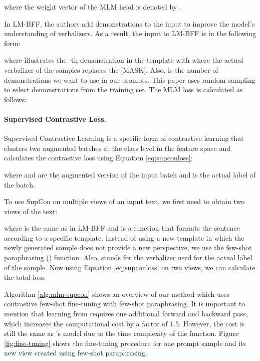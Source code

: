 \documentclass[11pt]{article}
\begin{document}
where the weight vector of the MLM head is denoted by .

In LM-BFF, the authors add demonstrations to the input  to improve the model's understanding of verbalizers. As a result, the input to LM-BFF is in the following form:


where  illustrates the -th demonstration in the template  with where the actual verbalizer of the samples replaces the [MASK]. Also,  is the number of demonstrations we want to use in our prompts. This paper uses random sampling to select demonstrations from the training set. The MLM loss is calculated as follows:


\paragraph{Supervised Contrastive Loss.}
Supervised Contrastive Learning is a specific form of contrastive learning \cite{chen2020simple, tian2020contrastive, liu2021bootstrapping} that clusters two augmented batches at the class level in the feature space and calculates the contrastive loss using Equation \ref{eq:supconloss}:

where  and  are the augmented version of the input batch  and  is the actual label of the batch.

To use SupCon on multiple views of an input text, we first need to obtain two views of the text:


where  is the same as  in LM-BFF and  is a function that formats the sentence according to a specific template. Instead of using a new template in which the newly generated sample does not provide a new perspective, we use the few-shot paraphrasing () function. Also,  stands for the verbalizer used for the actual label of the sample. Now using Equation \ref{eq:supconloss} on two views, we can calculate the total loss:


Algorithm \ref{alg:mlm-supcon} shows an overview of our method which uses contrastive few-shot fine-tuning with few-shot paraphrasing. It is important to mention that learning from  requires one additional forward and backward pass, which increases the computational cost by a factor of 1.5. However, the cost is still the same as 's model due to the  time complexity of the  function. Figure \ref{fig:fine-tuning} shows the fine-tuning procedure for one prompt sample and its new view created using few-shot paraphrasing.
\end{document}
